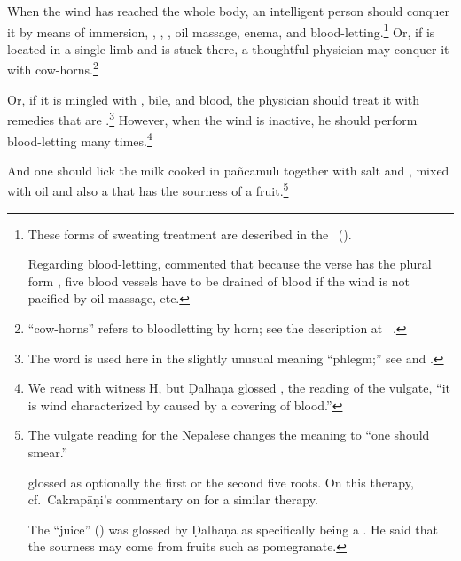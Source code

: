 \begin{translation}
    


    \item[10cd--11] 
    
When the wind has reached the whole body, an intelligent person should
conquer it by means of immersion, , , , oil massage, enema, and
blood-letting.\footnote{These forms of sweating treatment are
    described in the \CS\ ().
    
Regarding blood-letting,  commented  that because
the verse has the plural form , five blood vessels
have to be drained of blood if the wind is not pacified by oil
massage, etc.} Or, if is located in a single limb and is stuck there,
a thoughtful physician may conquer it with
cow-horns.\footnote{ “cow-horns” refers to bloodletting by
    horn; see the description at \SS\ .}
        
       
            
    \item[12] 
    
    Or, if it is mingled with , bile, and
blood, the physician should treat it with 
remedies that are .\footnote{The word 
 is used here in the
    slightly unusual meaning “phlegm;” see  and \cite[553]{josi-maha}.} However, when the
    wind is inactive, he should perform blood-letting many
    times.\footnote{We read  with witness H, but
        Ḍalhaṇa glossed , the reading of the vulgate, “it is
        wind characterized by  caused by a covering
        of blood.”}

    \item[13]
    
     And one should lick the milk cooked in \gls{pañcamūlī}
together with salt and ,
mixed with oil and also a  that has the sourness of
a fruit.\footnote{The vulgate reading  for the Nepalese 
 changes the meaning to “one should smear.”
    
     glossed  as optionally the first  or 
    the second five roots.  On this therapy, cf.\ Cakrapāṇi's commentary on 
     for a similar therapy.
    
    The “juice” () was glossed by Ḍalhaṇa as specifically
being a .   He said that the sourness
may come from fruits such as pomegranate.
    
}
\end{translation}
